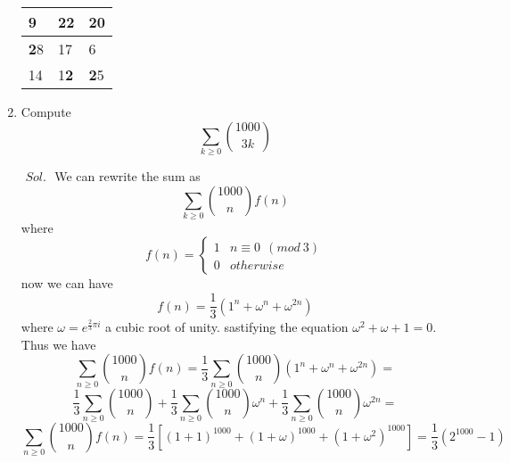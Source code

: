 \documentclass[a4paper]{article}
\theoremstyle{definition}
\begin{document}
\begin{enumerate}
\begin{table}[h]
\begin{center}
\begin{tabular}{|l|l|l|}
\hline
9  & \textbf{22} & \textbf{2}0 \\ \hline
\textbf{2}8 & 17 & 6  \\ \hline
14 & 1\textbf{2} & \textbf{2}5 \\ \hline
\end{tabular}
\end{center}
\end{table}
\newpage
\item Compute
$$\sum_{k \ge 0} {1000 \choose 3k}$$
\begin{tcolorbox}[width=\linewidth, sharp corners=all, colback=white!95!black]
    $\textit{ Sol. }$
    We can rewrite the sum as
    \[
        \sum_{k \ge 0} {1000 \choose n} f(n)
    \]
    where
    \[
        f(n) = \begin{cases}
            1 & n \equiv 0 \ \  (mod  \ 3) \\
            0 & otherwise
        \end{cases}
    \]
    now we can have
     \[
        f(n) = \dfrac{1}{3} (1^n + \omega^n + \omega ^{2n})
    \]
    where $\omega = e^{\frac{2}{3}\pi i}$ a cubic root of unity.
    sastifying the equation $\omega ^ 2 + \omega + 1 = 0$.
    Thus we have
    \[
        \sum_{n \ge 0} {1000 \choose n} f(n) = \dfrac{1}{3} \sum_{n \ge 0} {1000
        \choose n} (1^n + \omega^n + \omega ^{2n}) =
    \]
    \[
        \dfrac{1}{3} \sum_{n \ge 0} {1000 \choose n} + \dfrac{1}{3} \sum_{n \ge 0} {1000 \choose n} \omega^n + \dfrac{1}{3} \sum_{n \ge 0} {1000 \choose n} \omega ^{2n} =
    \]
    \[
        \sum_{n \ge 0} {1000 \choose n} f(n) = \dfrac{1}{3}[(1+1)^{1000} + (1+\omega)^{1000} + (1+\omega^2)^{1000}]
        = \dfrac{1}{3}(2^{1000} - 1)
    \]
\end{tcolorbox}
\end{enumerate}
\end{document}

